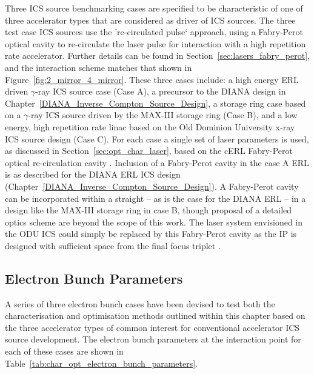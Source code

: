 \documentclass[../main.tex]{subfiles}
\begin{document}
Three ICS source benchmarking cases are specified to be characteristic of one of three accelerator types that are considered as driver of ICS sources. The three test case ICS sources use the 're-circulated pulse` approach, using a Fabry-Perot optical cavity to re-circulate the laser pulse for interaction with a high repetition rate accelerator. Further details can be found in Section~\ref{sec:lasers_fabry_perot}, and the interaction scheme matches that shown in Figure~\ref{fig:2_mirror_4_mirror}. These three cases include: a high energy ERL driven $\gamma$-ray ICS source case (Case A), a precursor to the DIANA design in Chapter~\ref{DIANA_Inverse_Compton_Source_Design}, a storage ring case based on a $\gamma$-ray ICS source driven by the MAX-III storage ring  \cite{owen2013nonequilibrium} (Case B), and a low energy, high repetition rate linac based on the Old Dominion University x-ray ICS source design \cite{krafft2016laser,deitrick2017inverse,deitrick2018high} (Case C). For each case a single set of laser parameters is used, as discussed in Section~\ref{sec:opt_char_laser}, based on the cERL Fabry-Perot optical re-circulation cavity \cite{akagi2016narrow}.  Inclusion of a Fabry-Perot cavity in the case A ERL is as described for the DIANA ERL ICS design (Chapter~\ref{DIANA_Inverse_Compton_Source_Design}). A Fabry-Perot cavity can be incorporated within a straight -- as is the case for the DIANA ERL -- in a design like the MAX-III storage ring in case B, though proposal of a detailed optics scheme are beyond the scope of this work. The laser system envisioned in the ODU ICS \cite{krafft2016laser,deitrick2017inverse,deitrick2018high} could simply be replaced by this Fabry-Perot cavity as the IP is designed with sufficient space from the final focus triplet \cite{deitrick2018high}.

\subsection{Electron Bunch Parameters}

A series of three electron bunch cases have been devised to test both the characterisation and optimisation methods outlined within this chapter based on the three accelerator types of common interest for conventional accelerator ICS source development. The electron bunch parameters at the interaction point for each of these cases are shown in Table~\ref{tab:char_opt_electron_bunch_parameters}.
\end{document}
